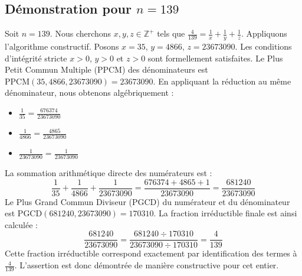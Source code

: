 \documentclass[11pt,a4paper]{article}
\begin{document}
\subsection{Démonstration pour $n = 139$}
Soit $n = 139$. Nous cherchons $x, y, z \in \mathbb{Z}^{+}$ tels que $\frac{4}{139} = \frac{1}{x} + \frac{1}{y} + \frac{1}{z}$.
Appliquons l'algorithme constructif. Posons $x = 35$, $y = 4866$, $z = 23673090$.
Les conditions d'intégrité stricte $x > 0$, $y > 0$ et $z > 0$ sont formellement satisfaites.
Le Plus Petit Commun Multiple (PPCM) des dénominateurs est $\text{PPCM}(35, 4866, 23673090) = 23673090$.
En appliquant la réduction au même dénominateur, nous obtenons algébriquement :
\begin{itemize}
    \item $\frac{1}{35} = \frac{676374}{23673090}$
    \item $\frac{1}{4866} = \frac{4865}{23673090}$
    \item $\frac{1}{23673090} = \frac{1}{23673090}$
\end{itemize}
La sommation arithmétique directe des numérateurs est :
$$ \frac{1}{35} + \frac{1}{4866} + \frac{1}{23673090} = \frac{676374 + 4865 + 1}{23673090} = \frac{681240}{23673090} $$
Le Plus Grand Commun Diviseur (PGCD) du numérateur et du dénominateur est $\text{PGCD}(681240, 23673090) = 170310$.
La fraction irréductible finale est ainsi calculée :
$$ \frac{681240}{23673090} = \frac{681240 \div 170310}{23673090 \div 170310} = \frac{4}{139} $$
Cette fraction irréductible correspond exactement par identification des termes à $\frac{4}{139}$. L'assertion est donc démontrée de manière constructive pour cet entier.
\end{document}
